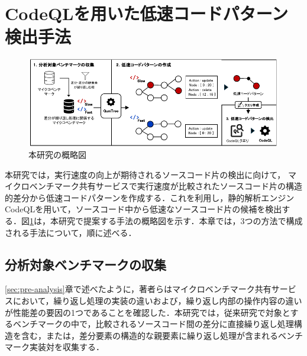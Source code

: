 \documentclass[submit,techrep,noauthor]{ipsj}
\newcommand{\memo}[1]{\colorbox{magenta!30}{{\bf MEMO}:}{\color{red!50} {\textbf{[#1]}}}}
\begin{document}
\section{CodeQLを用いた低速コードパターン検出手法}
\label{sec:approach}

\begin{figure}[t]
    \centering
    \includegraphics[width=0.9\linewidth]{./Noguchi_fig/approach_abst.pdf}
    \caption{本研究の概略図}
    \label{fig:Approach}
\end{figure}

本研究では，実行速度の向上が期待されるソースコード片の検出に向けて，
マイクロベンチマーク共有サービスで実行速度が比較されたソースコード片の構造的差分から低速コードパターンを作成する．これを利用し，静的解析エンジンCodeQLを用いて，ソースコード中から低速なソースコード片の候補を検出する．図\ref{fig:Approach}は，本研究で提案する手法の概略図を示す．本章では，3つの方法で構成される手法について，順に述べる．


\subsection{分析対象ベンチマークの収集}

\ref{sec:pre-analysis}章で述べたように，著者らはマイクロベンチマーク共有サービスにおいて，繰り返し処理の実装の違いおよび，繰り返し内部の操作内容の違いが性能差の要因の1つであることを確認した．本研究では，従来研究\cite{omori}で対象とするベンチマークの中で，比較されるソースコード間の差分に直接繰り返し処理構造を含む，または，差分要素の構造的な親要素に繰り返し処理が含まれるベンチマーク実装対を収集する．
\end{document}
